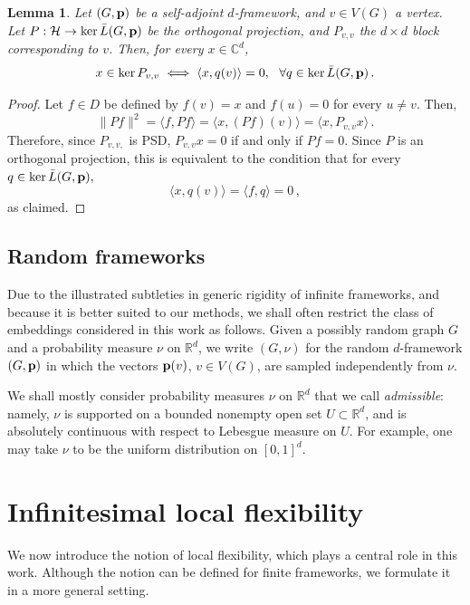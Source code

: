 \documentclass[10pt,a4paper]{amsart}
\numberwithin{equation}{section}
\newtheorem{lemma}[theorem]{Lemma}
\newcommand{\R}{\mathbb R}
\newcommand{\C}{\mathbb C}
\newcommand{\cH}{\mathcal H}
\newcommand{\p}{{\bf p}}
\begin{document}
\begin{lemma}\label{lem:forbidden_directions}
    Let $(G,\p)$ be a self-adjoint $d$-framework, and $v\in V(G)$ a vertex. Let $P:\cH\to\ker\bar L(G,\p)$ 
    be the orthogonal projection, and $P_{v,v}$ the $d\times d$ block corresponding to $v$. Then, for every $x\in \C^d$,
    \[
    x\in\ker P_{v,v} \iff \langle x,q(v)\rangle=0,~~\forall q\in\ker \bar L(G,\p)\,.
    \]
\end{lemma}
\begin{proof}
    Let $f\in D$ be defined by $f(v)=x$ and $f(u)=0$ for every $u\ne v$. Then,
    \[
    \|Pf\|^2 = \langle f,Pf\rangle = \langle x,(Pf)(v)\rangle = \langle x,P_{v,v}x\rangle\,.
    \]
    Therefore, since $P_{v,v,}$ is PSD, $P_{v,v}x=0$ if and only if $Pf=0$. Since $P$ is an orthogonal projection, this is equivalent to the condition that for every $q\in\ker \bar L(G,\p),$
    \[
    \langle x,q(v)\rangle = \langle f, q\rangle = 0\,,
    \]
    as claimed.
\end{proof}

\subsection{Random frameworks}\label{sec:admissible}
Due to the illustrated subtleties in generic rigidity of infinite frameworks, 
and because it is better suited to our methods, we shall often restrict the class of embeddings considered in this work as follows. 
Given a possibly random graph \(G\) and a probability measure \(\nu\) on
\(\R^d\), we write \((G,\nu)\) for the random \(d\)-framework \((G,\p)\)
in which the vectors \(\p(v)\), \(v\in V(G)\), are sampled independently
from \(\nu\).

We shall mostly consider probability measures \(\nu\) on \(\R^d\) that we
call \emph{admissible}: namely, \(\nu\) is supported on a bounded nonempty
open set \(U\subset\R^d\), and is absolutely continuous with respect to
Lebesgue measure on \(U\). For example, one may take \(\nu\) to be the
uniform distribution on \([0,1]^d\).


\section{Infinitesimal local flexibility}\label{sec:local_flex}
We now introduce the notion of local flexibility, which plays a central
role in this work. Although the notion can be defined for finite
frameworks, we formulate it in a more general setting.
\end{document}
